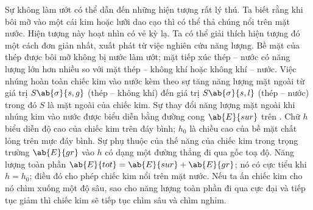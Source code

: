 Sự không làm ướt có thể dẫn đến những hiện tượng rất lý thú. Ta biết rằng khi bôi mỡ vào một cái kim hoặc lưỡi dao cạo thì có thể thả chúng nổi trên mặt nước. Hiện tượng này hoạt nhìn có vẻ kỳ lạ. Ta có thể giải thích hiện tượng đó một cách đơn giản nhất, xuất phát từ việc nghiên cứu năng lượng. Bề mặt của thép được bôi mỡ không bị nước làm ướt; mặt tiếp xúc thép -- nước có năng lượng lớn hơn nhiều so với mặt thép -- không khí hoặc không khí -- nước. Việc nhúng hoàn toàn chiếc kim vào nước kèm theo sự tăng năng lượng mặt ngoài từ giá trị $S\ab{\sigma}{s,g}$ (thép -- không khí) đến giá trị $S\ab{\sigma}{s,l}$ (thép -- nước) trong đó $S$ là mặt ngoài của chiếc kim. Sự thay đổi năng lượng mặt ngoài khi nhúng kim vào nước được biểu diễn bằng đường cong $\ab{E}{sur}$ trên . Chữ $h$ biểu diễn độ cao của chiếc kim trên đáy bình; $h_0$ là chiều cao của bề mặt chất lỏng trên mực đáy bình. Sự phụ thuộc của thế năng của chiếc kim trong trọng trường $\ab{E}{gr}$ vào $h$ có dạng một đường thẳng đi qua gốc toạ độ. Năng lượng toàn phần $\ab{E}{tot}=\ab{E}{sur}+\ab{E}{gr}$; nó có cực tiểu khi $h=h_0$; điều đó cho phép chiếc kim nổi trên mặt nước. Nếu ta ấn chiếc kim cho nó chìm xuống một độ sâu, sao cho năng lượng toàn phần đi qua cực đại và tiếp tục giảm thì chiếc kim sẽ tiếp tục chìm sâu và chìm nghỉm.

